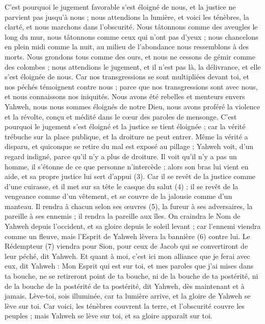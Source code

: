 \begin{multicols}{2}
{C'est pourquoi le jugement favorable s'est éloigné de nous, et la justice ne parvient pas jusqu’à nous ; nous attendions la lumière, et voici les ténèbres, la clarté, et nous marchons dans l'obscurité.
Nous tâtonnons comme des aveugles le long du mur, nous tâtonnons comme ceux qui n’ont pas d’yeux ; nous chancelons en plein midi comme la nuit, au milieu de l’abondance nous ressemblons à des morts.
Nous grondons tous comme des ours, et nous ne cessons de gémir comme des colombes ; nous attendions le jugement, et il n’est pas là, la délivrance, et elle s'est éloignée de nous.
Car nos transgressions se sont multipliées devant toi, et nos péchés témoignent contre nous ; parce que nos transgressions sont avec nous, et nous connaissons nos iniquités.
Nous avons été rebelles et menteurs envers Yahweh, nous nous sommes éloignés de notre Dieu, nous avons proféré la violence et la révolte, conçu et médité dans le cœur des paroles de mensonge.
C'est pourquoi le jugement s'est éloigné et la justice se tient éloignée ; car la vérité trébuche sur la place publique, et la droiture ne peut entrer.
Même la vérité a disparu, et quiconque se retire du mal est exposé au pillage ; Yahweh voit, d’un regard indigné, parce qu'il n'y a plus de droiture.
Il voit qu’il n’y a pas un homme, il s’étonne de ce que personne n’intercède ; alors son bras lui vient en aide, et sa propre justice lui sert d’appui (3).
Car il se revêt de la justice comme d'une cuirasse, et il met sur sa tête le casque du salut (4) ; il se revêt de la vengeance comme d’un vêtement, et se couvre de la jalousie comme d'un manteau.
Il rendra à chacun selon ses œuvres (5), la fureur à ses adversaires, la pareille à ses ennemis ; il rendra la pareille aux îles.
On craindra le Nom de Yahweh depuis l'occident, et sa gloire depuis le soleil levant ; car l'ennemi viendra comme un fleuve, mais l'Esprit de Yahweh lèvera la bannière (6) contre lui.
Le Rédempteur (7) viendra pour Sion, pour ceux de Jacob qui se convertiront de leur péché, dit Yahweh.
Et quant à moi, c'est ici mon alliance que je ferai avec eux, dit Yahweh : Mon Esprit qui est sur toi, et mes paroles que j'ai mises dans ta bouche, ne se retireront point de ta bouche, ni de la bouche de ta postérité, ni de la bouche de la postérité de ta postérité, dit Yahweh, dès maintenant et à jamais.
\VerseOne{}Lève-toi, sois illuminée, car ta lumière arrive, et la gloire de Yahweh se lève sur toi.
Car voici, les ténèbres couvrent la terre, et l'obscurité couvre les peuples ; mais Yahweh se lève sur toi, et sa gloire apparaît sur toi.
}
\end{multicols}
